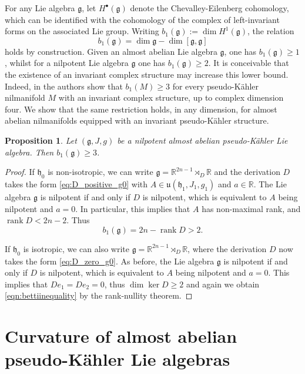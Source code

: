 \documentclass{article}
\newtheorem{proposition}[theorem]{Proposition}
\theoremstyle{definition}
\DeclareMathOperator{\rank}{rank}
\newcommand{\R}{\mathbb{R}}
\newcommand{\frg}{\mathfrak{g}}
\newcommand{\frh}{\mathfrak{h}}
\newcommand{\lie}[1]{\mathfrak{#1}}
\newcommand{\g}{\lie g}
\begin{document}
For any Lie algebra $\frg$, let $H^{\bullet}(\g)$ denote the Chevalley-Eilenberg cohomology, which can be identified with the cohomology of the complex of left-invariant forms on the associated Lie group. Writing $b_1(\frg):=\dim H^1(\frg)$, the relation $$b_1(\frg)=\dim\frg-\dim[\frg,\frg]$$ holds by construction. Given an almost abelian Lie algebra $\frg$, one has $b_1(\frg)\geq1$, whilst for a nilpotent Lie algebra $\frg$ one has $b_1(\frg)\geq2$. It is conceivable that the existence of an invariant complex structure may increase this lower bound. Indeed, in \cite[Theorem 5.8]{LU25} the authors show that $b_1(M)\geq3$ for every pseudo-Kähler nilmanifold $M$ with an invariant complex structure, up to complex dimension four. We show that the same restriction holds, in any dimension, for almost abelian nilmanifolds equipped with an invariant pseudo-Kähler structure.

\begin{proposition}\label{prop:b1>2_in_PK}
    Let $(\frg,J,g)$ be a nilpotent almost abelian pseudo-Kähler Lie algebra. Then $b_1(\frg)\geq3$.
\end{proposition}

\begin{proof}
    If $\frh_0$ is non-isotropic, we can write $\frg=\R^{2n-1}\rtimes_D\R$ and the derivation $D$ takes the form \eqref{eq:D_positive_g0} with $A\in\mathfrak{u}(\frh_1,J_1,g_1)$ and $a\in\R$. The Lie algebra $\frg$ is nilpotent if and only if $D$ is nilpotent, which is equivalent to $A$ being nilpotent and $a=0$. In particular, this implies that $A$ has non-maximal rank, and $\rank D<2n-2$. Thus \begin{equation}\label{eqn:bettiinequality}
        b_1(\frg)=2n-\rank D >2.
    \end{equation}

    If $\frh_0$ is isotropic, we can also write $\frg=\R^{2n-1}\rtimes_D\R$, where the derivation $D$ now takes the form \eqref{eq:D_zero_g0}. As before, the Lie algebra $\frg$ is nilpotent if and only if $D$ is nilpotent, which is equivalent to $A$ being nilpotent and $a=0$. This implies that $De_1=De_2=0$, thus $\dim\ker D\geq2$ and again we obtain \eqref{eqn:bettiinequality} by the rank-nullity theorem.
\end{proof}


\section{Curvature of almost abelian pseudo-Kähler Lie algebras}\label{section:curvature}
\end{document}
